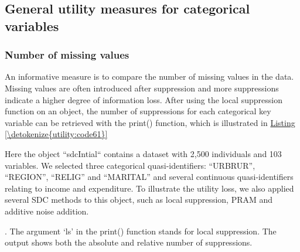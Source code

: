 \documentclass[letterpaper,10pt,english]{sphinxmanual}
\begin{document}
\subsection{General utility measures for categorical variables}
\label{\detokenize{utility:general-utility-measures-for-categorical-variables}}

\subsubsection{Number of missing values}
\label{\detokenize{utility:number-of-missing-values}}
An informative measure is to compare the number of missing values in the
data. Missing values are often introduced after suppression and more
suppressions indicate a higher degree of information loss. After using
the local suppression function on an  object, the number of
suppressions for each categorical key variable can be retrieved with the
print() function, which is illustrated in \hyperref[\detokenize{utility:code61}]{Listing \ref{\detokenize{utility:code61}}} %
\begin{footnote}[2]\sphinxAtStartFootnote
Here the  object “sdcIntial“ contains a dataset with 2,500
individuals and 103 variables. We selected three categorical
quasi-identifiers: “URBRUR”, “REGION”, “RELIG” and “MARITAL” and
several continuous quasi-identifiers relating to income and
expenditure. To illustrate the utility loss, we also applied several
SDC methods to this  object, such as local suppression,
PRAM and additive noise addition.
%
\end{footnote}.
The argument ‘ls’ in the print() function
stands for local suppression. The output shows both the absolute and
relative number of suppressions.
\end{document}
